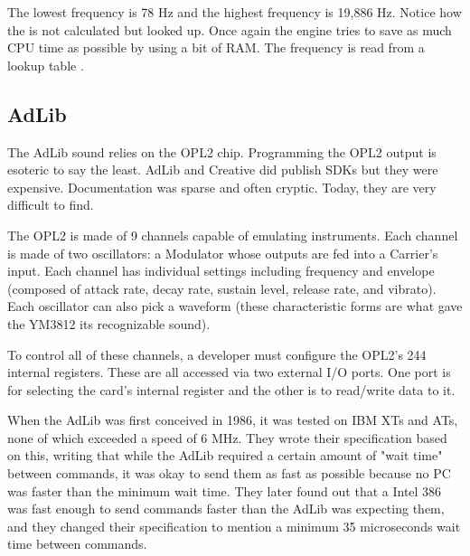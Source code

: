 \documentclass[book.tex]{subfiles}
\begin{document}
\par
The lowest frequency is 78 Hz and the highest frequency is 19,886 Hz. Notice how the  is not calculated but looked up. Once again the engine tries to save as much CPU time as possible by using a bit of RAM. The frequency is read from a lookup table .\\

\par
\begin{minipage}{\textwidth}

\end{minipage}
\par

\subsection{AdLib}
The AdLib sound relies on the OPL2 chip. Programming the OPL2 output is esoteric to say the least. AdLib and Creative did publish SDKs but they were expensive.  Documentation was sparse and often cryptic. Today, they are very difficult to find.\\
\par
The OPL2 is made of 9 channels capable of emulating instruments. Each channel is made of two oscillators: a Modulator whose outputs are fed into a Carrier's input. Each channel has individual settings including frequency and envelope (composed of attack rate, decay rate, sustain level, release rate, and vibrato). Each oscillator can also pick a waveform (these characteristic forms are what gave the YM3812 its recognizable sound).\\
\par
 To control all of these channels, a developer must configure the OPL2's 244 internal registers. These are all accessed via two external I/O ports. One port is for selecting the card's internal register and the other is to read/write data to it.\\
\par
\begin{minipage}{\textwidth}

\end{minipage}
\par
When the AdLib was first conceived in 1986, it was tested on IBM XTs and ATs, none of which exceeded a speed of 6 MHz. They wrote their specification based on this, writing that while the AdLib required a certain amount of "wait time" between commands, it was okay to send them as fast as possible because no PC was faster than the minimum wait time. They later found out that a Intel 386 was fast enough to send commands faster than the AdLib was expecting them, and they changed their specification to mention a minimum 35 microseconds wait time between commands.\\
\end{document}

